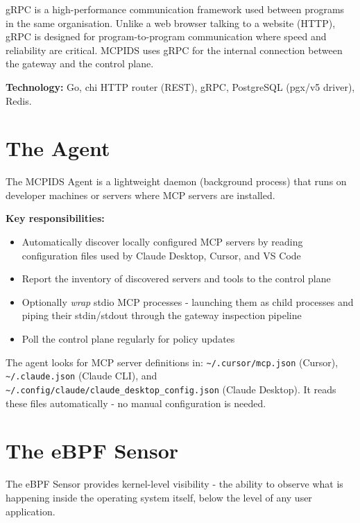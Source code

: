 \documentclass[12pt,a4paper]{report}
\begin{document}
\begin{infobox}
gRPC is a high-performance communication framework used between programs
in the same organisation. Unlike a web browser talking to a website (HTTP),
gRPC is designed for program-to-program communication where speed and
reliability are critical. MCPIDS uses gRPC for the internal connection
between the gateway and the control plane.
\end{infobox}

\textbf{Technology:} Go, chi HTTP router (REST), gRPC, PostgreSQL (pgx/v5 driver), Redis.

\section{The Agent}

The MCPIDS Agent is a lightweight daemon (background process) that runs on
developer machines or servers where MCP servers are installed.

\textbf{Key responsibilities:}
\begin{itemize}
  \item Automatically discover locally configured MCP servers by reading
    configuration files used by Claude Desktop, Cursor, and VS Code
  \item Report the inventory of discovered servers and tools to the control plane
  \item Optionally \textit{wrap} stdio MCP processes - launching them as child
    processes and piping their stdin/stdout through the gateway inspection pipeline
  \item Poll the control plane regularly for policy updates
\end{itemize}

\begin{infobox}
The agent looks for MCP server definitions in:
\texttt{\textasciitilde/.cursor/mcp.json} (Cursor),
\texttt{\textasciitilde/.claude.json} (Claude CLI), and
\texttt{\textasciitilde/.config/claude/claude\_desktop\_config.json}
(Claude Desktop). It reads these files automatically - no manual
configuration is needed.
\end{infobox}

\section{The eBPF Sensor}

The eBPF Sensor provides kernel-level visibility - the ability to observe what
is happening inside the operating system itself, below the level of any user
application.
\end{document}
